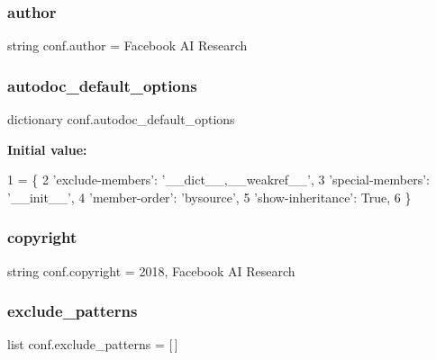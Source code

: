 \subsubsection{\texorpdfstring{author}{author}}
{\footnotesize\ttfamily string conf.\+author = \textquotesingle{}Facebook AI Research\textquotesingle{}}

\mbox{\label{namespaceconf_ae1323788e132618f5d7b9839f2adc5e3}} 
\subsubsection{\texorpdfstring{autodoc\+\_\+default\+\_\+options}{autodoc\_default\_options}}
{\footnotesize\ttfamily dictionary conf.\+autodoc\+\_\+default\+\_\+options}

{\bfseries Initial value\+:}
\begin{DoxyCode}
1 =  \{
2     \textcolor{stringliteral}{'exclude-members'}: \textcolor{stringliteral}{'\_\_dict\_\_,\_\_weakref\_\_'},
3     \textcolor{stringliteral}{'special-members'}: \textcolor{stringliteral}{'\_\_init\_\_'},
4     \textcolor{stringliteral}{'member-order'}: \textcolor{stringliteral}{'bysource'},
5     \textcolor{stringliteral}{'show-inheritance'}: \textcolor{keyword}{True},
6 \}
\end{DoxyCode}
\mbox{\label{namespaceconf_a33fa97cf51dcb25970fbf53f10159589}} 
\subsubsection{\texorpdfstring{copyright}{copyright}}
{\footnotesize\ttfamily string conf.\+copyright = \textquotesingle{}2018, Facebook AI Research\textquotesingle{}}

\mbox{\label{namespaceconf_a7ad48fb6f3e9b129c02346ea0d3527c1}} 
\subsubsection{\texorpdfstring{exclude\+\_\+patterns}{exclude\_patterns}}
{\footnotesize\ttfamily list conf.\+exclude\+\_\+patterns = \mbox{[}$\,$\mbox{]}}

